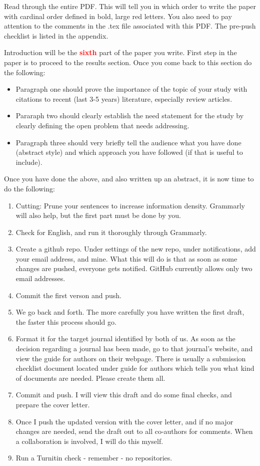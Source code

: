 \documentclass[12 pt]{article}
\begin{document}
Read through the entire PDF. This will tell you in which order to write the paper with cardinal order defined in bold, large red letters. You also need to pay attention to the comments in the .tex file associated with this PDF. The pre-push checklist is listed in the appendix.

Introduction will be the \textbf{\Huge \textcolor{red}{sixth}} part of the paper you write. First step in the paper is to proceed to the results section. Once you come back to this section do the following:

\begin{itemize}
\item Paragraph one should prove the importance of the topic of your study with citations to recent (last 3-5 years) literature, especially review articles.
\item Pararaph two should clearly establish the need statement for the study by clearly defining the open problem that needs addressing.
\item Paragraph three should very briefly tell the audience what you have done (abstract style) and which approach you have followed (if that is useful to include).
\end{itemize}

Once you have done the above, and also written up an abstract, it is now time to do the following:

\begin{enumerate}
\item Cutting: Prune your sentences to increase information density. Grammarly will also help, but the first part must be done by you.
\item Check for English\cite{burchfield:1998,strunk:2000}, and run it thoroughly through Grammarly.
\item Create a github repo. Under settings of the new repo, under notifications, add your email address, and mine. What this will do is that as soon as some changes are pushed, everyone gets notified. GitHub currently allows only two email addresses.
\item Commit the first verson and push.
\item We go back and forth. The more carefully you have written the first draft, the faster this process should go.
\item Format it for the target journal identified by both of us. As soon as the decision regarding a journal has been made, go to that journal's website, and view the guide for authors on their webpage. There is usually a submission checklist document located under guide for authors which tells you what kind of documents are needed. Please create them all.
\item Commit and push. I will view this draft and do some final checks, and prepare the cover letter.
\item Once I push the updated version with the cover letter, and if no major changes are needed, send the draft out to all co-authors for comments. When a collaboration is involved, I will do this myself.
\item Run a Turnitin check - remember - no repositories.
\end{enumerate}
\end{document}
